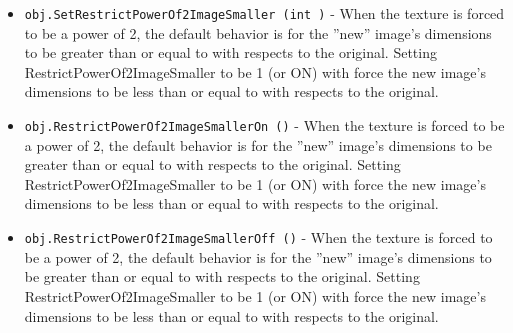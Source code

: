 \begin{itemize}
\item  \verb|obj.SetRestrictPowerOf2ImageSmaller (int )| -  When the texture is forced to be a power of 2, the default behavior is
 for the ''new'' image's dimensions  to be greater than or equal to with 
 respects to the original.  Setting RestrictPowerOf2ImageSmaller to be
 1 (or ON) with force the new image's dimensions to be less than or equal 
 to with respects to the original.

\item  \verb|obj.RestrictPowerOf2ImageSmallerOn ()| -  When the texture is forced to be a power of 2, the default behavior is
 for the ''new'' image's dimensions  to be greater than or equal to with 
 respects to the original.  Setting RestrictPowerOf2ImageSmaller to be
 1 (or ON) with force the new image's dimensions to be less than or equal 
 to with respects to the original.

\item  \verb|obj.RestrictPowerOf2ImageSmallerOff ()| -  When the texture is forced to be a power of 2, the default behavior is
 for the ''new'' image's dimensions  to be greater than or equal to with 
 respects to the original.  Setting RestrictPowerOf2ImageSmaller to be
 1 (or ON) with force the new image's dimensions to be less than or equal 
 to with respects to the original.

\end{itemize}
